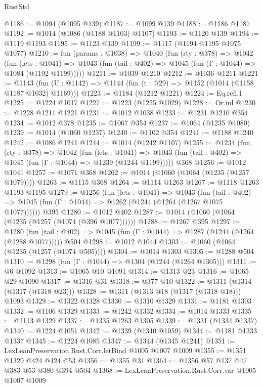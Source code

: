 \begin{lexlean}{RustStd}
\begin{coremodule}
@1186 := @1094 (@1095 @139)
@1187 := @1099 @139
@1188 := @1186 @1187
@1192 := @1014 (@1086 (@1188 @1103) @1107)
@1193 := @1120 @139
@1194 := @1119 @1193
@1195 := @1123 @139
@1199 := @1117 (@1194 @1195 @1075 @1077)
@1210 := fun (params : @1038) =>
  @1040
    (fun (rty : @378) =>
    @1042
      (fun (lets : @1041) =>
      @1043 (fun (tail : @402) => @1045 (fun (Γ : @1044) => @1084 (@1192 @1199)))))
@1211 := @1039 @1210
@1212 := @1036 @1211
@1221 := @1143 (fun (U : @1142) => @1144 (fun (t : @29) => @1152 (@1014 (@1158 @1187 @1032) @1169)))
@1223 := @1184 (@1212 @1221)
@1224 := Eq.refl.{1}
@1225 := @1224 @1017
@1227 := @1223 (@1225 @1029)
@1228 := Or.inl
@1230 := @1228 @1211 @1221
@1231 := @1012 @1038
@1233 := @1231 @1210 @354
@1234 := @1012 @378
@1235 := @1067 @354
@1237 := @1064 (@1235 @1080)
@1239 := @1014 (@1060 @1237)
@1240 := @1102 @354
@1241 := @1188 @1240
@1242 := @1086 @1241
@1244 := @1014 (@1242 @1107)
@1255 := @1234
    (fun (rty : @378) =>
    @1042
      (fun (lets : @1041) =>
      @1043 (fun (tail : @402) => @1045 (fun (Γ : @1044) => @1239 (@1244 @1199)))))
    @368
@1256 := @1012 @1041
@1257 := @1071 @368
@1262 := @1014 (@1060 (@1064 (@1235 (@1257 @1079))))
@1263 := @1115 @368
@1264 := @1114 @1263
@1267 := @1118 @1263 @1193 @1195
@1279 := @1256
    (fun (lets : @1041) =>
    @1043
      (fun (tail : @402) => @1045 (fun (Γ : @1044) => @1262 (@1244 (@1264 (@1267 @1075 @1077))))))
    @395
@1280 := @1012 @402
@1287 := @1014 (@1060 (@1064 (@1235 (@1257 (@1074 (@396 @1077))))))
@1288 := @1267 @395
@1297 := @1280
    (fun (tail : @402) => @1045 (fun (Γ : @1044) => @1287 (@1244 (@1264 (@1288 @1077)))))
    @504
@1298 := @1012 @1044
@1303 := @1060 (@1064 (@1235 (@1257 (@1074 @505))))
@1304 := @1014 @1303
@1305 := @1288 @504
@1310 := @1298 (fun (Γ : @1044) => @1304 (@1244 (@1264 @1305)))
@1311 := @6 @1092
@1313 := @1065 @10 @1091
@1314 := @1313 @23
@1316 := @1065 @29 @1090
@1317 := @1316 @31
@1318 := @377 @10
@1322 := @1311 (@1314 (@1317 (@1318 @23)))
@1328 := @1311 (@1313 @18 (@1317 (@1318 @18))) @1093
@1329 := @1322 @1328
@1330 := @1310 @1329
@1331 := @1181 @1303
@1332 := @1106 @1329
@1333 := @1242 @1332
@1334 := @1014 @1333
@1335 := @1113 @1329
@1337 := @1335 @1263 @1305
@1339 := @1331 (@1334 @1337)
@1340 := @1224 @1051
@1342 := @1339 (@1340 @1059)
@1344 := @1181 @1333 @1337
@1345 := @1224 @1085
@1347 := @1344 (@1345 @1241)
@1351 := LexLeanPreservation.Rust.Corr.letBind @1005 @1007 @1009
@1355 := @1351 @1329 @424 @424 @53
@1356 := @1355 @31
@1364 := @1356 @57 @137 @47 @383 @53 @380 @394 @504
@1368 := LexLeanPreservation.Rust.Corr.var @1005 @1007 @1009

\end{coremodule}
\end{lexlean}
